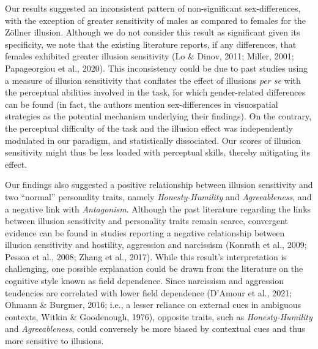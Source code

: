 \documentclass[
  man,floatsintext]{apa6}
\begin{document}
Our results suggested an inconsistent pattern of non-significant sex-differences, with the exception of greater sensitivity of males as compared to females for the Zöllner illusion. Although we do not consider this result as significant given its specificity, we note that the existing literature reports, if any differences, that females exhibited greater illusion sensitivity (Lo \& Dinov, 2011; Miller, 2001; Papageorgiou et al., 2020). This inconsistency could be due to past studies using a measure of illusion sensitivity that conflates the effect of illusions \emph{per se} with the perceptual abilities involved in the task, for which gender-related differences can be found (in fact, the authors mention sex-differences in visuospatial strategies as the potential mechanism underlying their findings). On the contrary, the perceptual difficulty of the task and the illusion effect was independently modulated in our paradigm, and statistically dissociated. Our scores of illusion sensitivity might thus be less loaded with perceptual skills, thereby mitigating its effect.

Our findings also suggested a positive relationship between illusion sensitivity and two ``normal'' personality traits, namely \emph{Honesty-Humility} and \emph{Agreeableness}, and a negative link with \emph{Antagonism}. Although the past literature regarding the links between illusion sensitivity and personality traits remain scarce, convergent evidence can be found in studies reporting a negative relationship between illusion sensitivity and hostility, aggression and narcissism (Konrath et al., 2009; Pessoa et al., 2008; Zhang et al., 2017). While this result's interpretation is challenging, one possible explanation could be drawn from the literature on the cognitive style known as field dependence. Since narcissism and aggression tendencies are correlated with lower field dependence (D'Amour et al., 2021; Ohmann \& Burgmer, 2016; i.e., a lesser reliance on external cues in ambiguous contexts, Witkin \& Goodenough, 1976), opposite traits, such as \emph{Honesty-Humility} and \emph{Agreeableness}, could conversely be more biased by contextual cues and thus more sensitive to illusions.
\end{document}
